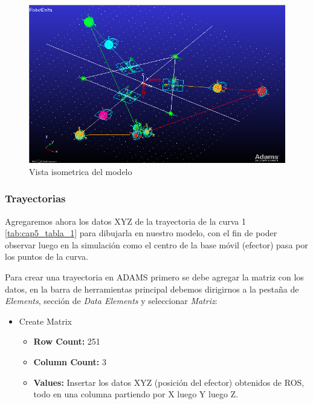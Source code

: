         \begin{figure}[H]
            \centering
            \includegraphics[width=1\linewidth]{Main/Chapter6/Images6/adams/base-movil/isometrica.png}
            \caption{Vista isometrica del modelo}
            \label{f:Cap6_adams_final_isoemtrica}
        \end{figure}
        
        
        \subsubsection{Trayectorias}
        
        Agregaremos ahora los datos XYZ de la trayectoria de la curva 1 \eqref{tab:cap5_tabla_1} para dibujarla en nuestro modelo, con el fin de poder observar luego en la simulación como el centro de la base móvil (efector) pasa por los puntos de la curva.
        
        Para crear una trayectoria en ADAMS primero se debe agregar la matriz con los datos, en la barra de herramientas principal debemos dirigirnos a la pestaña de \textit{Elements}, sección de \textit{Data Elements} y seleccionar \textit{Matriz}:
            
        
        \begin{scope}
            \renewcommand{\labelitemi}{\blacklozenge}
            \renewcommand{\labelitemii}{\checkmark}
            \begin{itemize}
                \item Create Matrix
                \begin{itemize}
                    \item \textbf{Row Count:} 251
                    \item \textbf{Column Count:} 3
                    \item \textbf{Values:}  Insertar los datos XYZ (posición del efector) obtenidos de ROS, todo en una columna partiendo por X luego Y luego Z.
                \end{itemize}
            \end{itemize}
        \end{scope}
        
